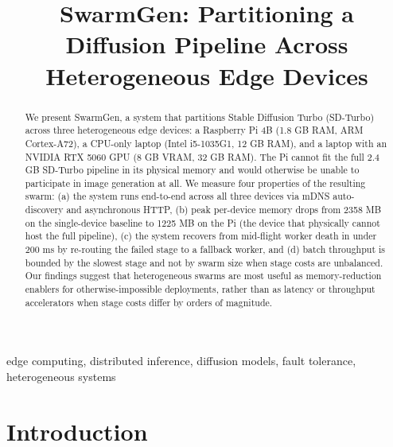 \documentclass[conference]{IEEEtran}
\begin{document}
\title{SwarmGen: Partitioning a Diffusion Pipeline Across Heterogeneous Edge Devices}

\author{
\and
{}
}

\maketitle

\begin{abstract}
We present SwarmGen, a system that partitions Stable Diffusion Turbo (SD-Turbo)
across three heterogeneous edge devices: a Raspberry Pi 4B (1.8 GB RAM,
ARM Cortex-A72), a CPU-only laptop (Intel i5-1035G1, 12 GB RAM), and a laptop
with an NVIDIA RTX 5060 GPU (8 GB VRAM, 32 GB RAM). The Pi cannot fit the full
2.4 GB SD-Turbo pipeline in its physical memory and would otherwise be unable
to participate in image generation at all. We measure four properties of the
resulting swarm: (a) the system runs end-to-end across all three devices via
mDNS auto-discovery and asynchronous HTTP, (b) peak per-device memory drops
from 2358 MB on the single-device baseline to 1225 MB on the Pi (the device
that physically cannot host the full pipeline), (c) the system recovers from
mid-flight worker death in under 200 ms by re-routing the failed stage to a
fallback worker, and (d) batch throughput is bounded by the slowest stage and
not by swarm size when stage costs are unbalanced. Our findings suggest that
heterogeneous swarms are most useful as memory-reduction enablers for
otherwise-impossible deployments, rather than as latency or throughput
accelerators when stage costs differ by orders of magnitude.
\end{abstract}

\begin{IEEEkeywords}
edge computing, distributed inference, diffusion models, fault tolerance, heterogeneous systems
\end{IEEEkeywords}

\section{Introduction}
\end{document}
